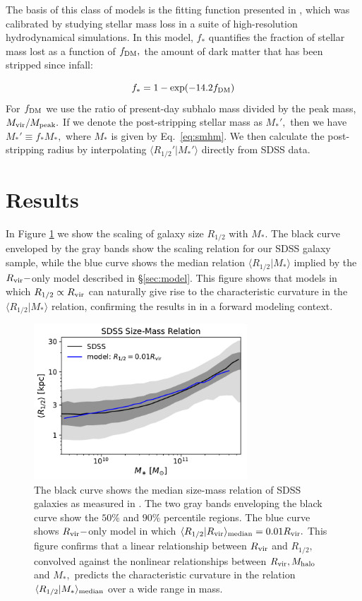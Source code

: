 \documentclass[usenatbib,usegraphicx,letterpaper]{mn2e}
\newcommand{\beq}{\begin{equation}}
\newcommand{\eeq}{\end{equation}}
\newcommand{\rhalf}{R_{1/2}}
\newcommand{\mstar}{M_{\ast}}
\newcommand{\mhalo}{M_{\rm halo}}
\newcommand{\rvir}{R_{\rm vir}}
\newcommand{\median}[2]{\langle{#1}\vert{#2}\rangle_{\rm median}}
\begin{document}
The basis of this class of models is the fitting function presented in \citet{smith_etal16}, which was calibrated by studying stellar mass loss in a suite of high-resolution hydrodynamical simulations. In this model, $f_{\ast}$ quantifies the fraction of stellar mass lost as a function of $f_{\rm DM},$ the amount of dark matter that has been stripped since infall:

\beq
f_{\ast} = 1 - \exp(-14.2f_{\rm DM})
\eeq
For $f_{\rm DM}$ we use the ratio of present-day subhalo mass divided by the peak mass, $M_{\rm vir}/M_{\rm peak}.$ If we denote the post-stripping stellar mass as $M_{\ast}',$ then we have $M_{\ast}'\equiv f_{\ast}M_{\ast},$ where $M_{\ast}$ is given by Eq.~\ref{eq:smhm}. We then calculate the post-stripping radius by interpolating $\langle\rhalf'\vert\mstar'\rangle$ directly from SDSS data.

\section{Results}
\label{sec:results}

In Figure \ref{fig:scatter_plot} we show the scaling of galaxy size $\rhalf$ with $\mstar.$ The black curve enveloped by the gray bands show the scaling relation for our SDSS galaxy sample, while the blue curve shows the median relation $\langle\rhalf\vert\mstar\rangle$ implied by the $\rvir-$only model described in \S\ref{sec:model}. This figure shows that models in which $\rhalf\propto\rvir$ can naturally give rise to the characteristic curvature in the $\langle\rhalf\vert\mstar\rangle$ relation, confirming the results in \citet{kravtsov13} in a forward modeling context.

\begin{figure}
\centering
\includegraphics[width=8cm]{FIGS/rvir_only_rhalf_vs_mstar_sham_model.pdf}
\caption{
The black curve shows the median size-mass relation of SDSS galaxies as measured in \citet{meert_etal15}. The two gray bands enveloping the black curve show the $50\%$ and $90\%$ percentile regions. The blue curve shows $\rvir-$only model in which $\median{\rhalf}{\rvir}=0.01\rvir.$ This figure confirms that a linear relationship between $\rvir$ and $\rhalf,$ convolved against the nonlinear relationships between $\rvir, \mhalo$ and $\mstar,$  predicts the characteristic curvature in the relation $\median{\rhalf}{\mstar}$ over a wide range in mass.
}
\label{fig:scatter_plot}
\end{figure}
\end{document}
